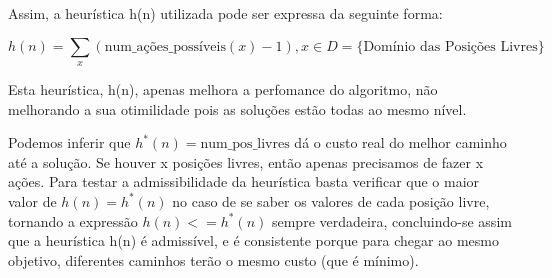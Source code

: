 \documentclass[12pt,a4paper]{article}
\begin{document}
  Assim, a heurística h(n) utilizada pode ser expressa da seguinte forma:
  
  $$
  h(n) = \sum_x {(\text{num\_ações\_possíveis}(x) -1)} , x \in D = \{\text{Domínio das Posições Livres}\}
  $$

  
  Esta heurística, h(n), apenas melhora a perfomance do algoritmo, não melhorando a sua otimilidade pois as soluções estão todas ao mesmo nível.

  Podemos inferir que $h^*(n) = \text{num\_pos\_livres}$ dá o custo real do melhor caminho até a solução. Se houver x posições livres, então apenas precisamos de fazer x ações.
  Para testar a admissibilidade da heurística basta verificar que o maior valor de $h(n) = h^*(n)$ no caso de se saber os valores de cada posição livre, tornando a expressão $h(n) <= h^*(n)$ sempre verdadeira,
  concluindo-se assim que a heurística h(n) é admissível, e é consistente porque para chegar ao mesmo objetivo, diferentes caminhos terão o mesmo custo (que é mínimo).
\end{document}

